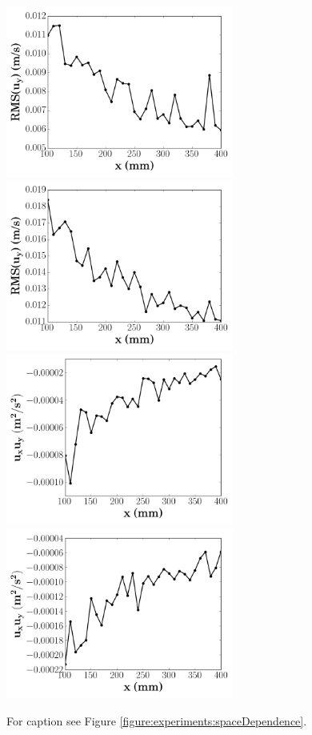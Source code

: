 \documentclass[12pt,oneside,a4paper]{article}
\begin{document}
\begin{figure}
\ContinuedFloat
\captionsetup{list=off,format=cont}
\centering
\includegraphics[width=7.5cm]{images/LDA_spaceDependenceImages/4Hz_15mm_RMSuy.png}\hfill
\includegraphics[width=7.5cm]{images/LDA_spaceDependenceImages/8Hz_15mm_RMSuy.png}\\
\includegraphics[width=7.5cm]{images/LDA_spaceDependenceImages/4Hz_15mm_uv.png}\hfill
\includegraphics[width=7.5cm]{images/LDA_spaceDependenceImages/8Hz_15mm_uv.png}
\caption{For caption see Figure \ref{figure:experiments:spaceDependence}.}
\end{figure}
%
\end{document}
